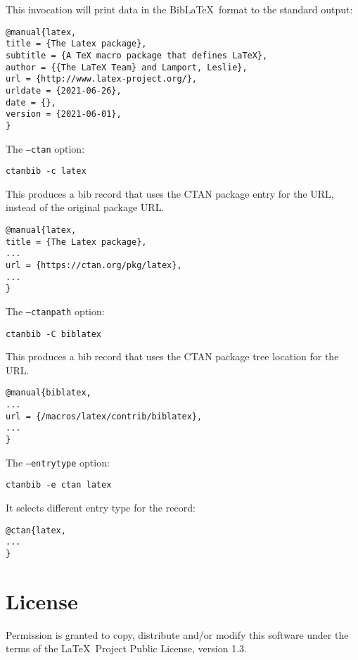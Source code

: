 \documentclass{ltxdoc}
\begin{document}
\noindent This invocation will print data in the Bib\LaTeX\ format to the standard output:

\begin{verbatim}
@manual{latex,
title = {The Latex package},
subtitle = {A TeX macro package that defines LaTeX},
author = {{The LaTeX Team} and Lamport, Leslie},
url = {http://www.latex-project.org/},
urldate = {2021-06-26},
date = {},
version = {2021-06-01},
}
\end{verbatim}

\noindent The \texttt{--ctan} option:

\begin{verbatim}
ctanbib -c latex
\end{verbatim}

\noindent This produces a bib record that uses the CTAN package entry for the URL, 
instead of the original package URL.


\begin{verbatim}
@manual{latex,
title = {The Latex package},
...
url = {https://ctan.org/pkg/latex},
...
}
\end{verbatim}

\noindent The \texttt{--ctanpath} option:

\begin{verbatim}
ctanbib -C biblatex
\end{verbatim}

\noindent This produces a bib record that uses the CTAN package tree location for the URL.

\begin{verbatim}
@manual{biblatex,
...
url = {/macros/latex/contrib/biblatex},
...
}
\end{verbatim}



\noindent The \texttt{--entrytype} option:

\begin{verbatim}
ctanbib -e ctan latex
\end{verbatim}

\noindent It selects different entry type for the record:

\begin{verbatim}
@ctan{latex,
...
}
\end{verbatim}


\section{License}

Permission is granted to copy, distribute and/or modify this software
under the terms of the \LaTeX\ Project Public License, version 1.3.
\end{document}
